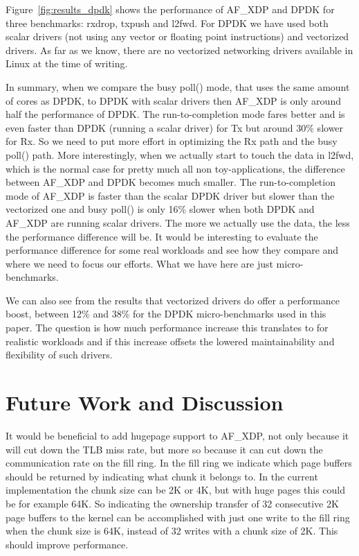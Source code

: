 \documentclass[9pt,numbers,reprint]{sigplanconf}
\begin{document}
Figure~\ref{fig:results_dpdk} shows the performance of AF\_XDP and
DPDK for three benchmarks: rxdrop, txpush and l2fwd. For DPDK we have
used both scalar drivers (not using any vector or floating point
instructions) and vectorized drivers. As far as we know, there are no
vectorized networking drivers available in Linux at the time of
writing.

In summary, when we compare the busy poll() mode, that uses the same
amount of cores as DPDK, to DPDK with scalar drivers then AF\_XDP is
only around half the performance of DPDK. The run-to-completion mode
fares better and is even faster than DPDK (running a scalar driver)
for Tx but around 30\% slower for Rx. So we need to put more effort in
optimizing the Rx path and the busy poll() path. More interestingly,
when we actually start to touch the data in l2fwd, which is the normal
case for pretty much all non toy-applications, the difference between
AF\_XDP and DPDK becomes much smaller. The run-to-completion mode of
AF\_XDP is faster than the scalar DPDK driver but slower than the
vectorized one and busy poll() is only 16\% slower when both DPDK and
AF\_XDP are running scalar drivers. The more we actually use the data,
the less the performance difference will be. It would be interesting
to evaluate the performance difference for some real workloads and see
how they compare and where we need to focus our efforts. What we have
here are just micro-benchmarks.

We can also see from the results that vectorized drivers do offer a
performance boost, between 12\% and 38\% for the DPDK micro-benchmarks
used in this paper. The question is how much performance increase this
translates to for realistic workloads and if this increase offsets the
lowered maintainability and flexibility of such drivers.


\section{Future Work and Discussion}
\label{sec:future}

It would be beneficial to add hugepage support to AF\_XDP, not only
because it will cut down the TLB miss rate, but more so because it can
cut down the communication rate on the fill ring. In the fill ring we
indicate which page buffers should be returned by indicating what
chunk it belongs to. In the current implementation the chunk size can
be 2K or 4K, but with huge pages this could be for example 64K. So
indicating the ownership transfer of 32 consecutive 2K page buffers to
the kernel can be accomplished with just one write to the fill ring
when the chunk size is 64K, instead of 32 writes with a chunk size of
2K. This should improve performance.
\end{document}
